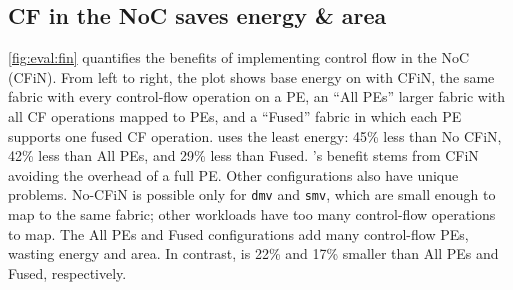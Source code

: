 \subsection{CF in the NoC saves energy \& area}
\autoref{fig:eval:fin} quantifies the benefits of implementing control flow in the NoC (CFiN).
% 
From left to right, the plot shows base energy on \riptide with CFiN,
the same fabric with every control-flow operation on a PE,
an ``All PEs'' larger fabric with all CF operations mapped to PEs,
and a ``Fused'' fabric in which each PE supports one fused CF operation.
% 
\riptide uses the least energy: 45\% less than No CFiN, 42\% less than All PEs, and 29\% less than Fused.
% 
\riptide's benefit stems from CFiN avoiding the overhead of a full PE.
%
Other configurations also have unique problems.
% 
No-CFiN is possible only for {\tt dmv} and {\tt smv}, which are small enough to map to the
same \riptide fabric; other workloads have too many control-flow operations to map.
% 
The All PEs and Fused configurations add many control-flow PEs, wasting energy and area.
% 
In contrast, \riptide is 22\% and 17\% smaller than All PEs and Fused, respectively.
